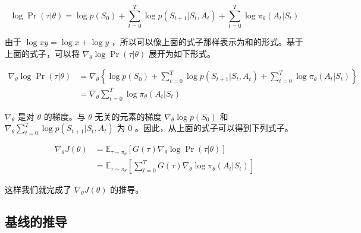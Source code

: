\documentclass[lang=cn,newtx,10pt,scheme=chinese]{elegantbook}
\begin{document}
\begin{equation}
\log\Pr(\tau|\theta)=\log{p(S_0)} + \sum_{t=0}^T\log{p(S_{t+1}|S_t,A_t)} + \sum_{t=0}^T\log\pi_\theta(A_t|S_t)
\end{equation}

由于 $\log xy = \log x + \log y$ ，所以可以像上面的式子那样表示为和的形式。基于上面的式子，可以将 $\nabla_\theta{\log\Pr(\tau|\theta)}$ 展开为如下形式。

\begin{equation}
\begin{aligned}
\nabla_\theta\log\Pr(\tau|\theta) &= \nabla_\theta\left\lbrace\log{p(S_0)} + \sum_{t=0}^T\log{p(S_{t+1}|S_t,A_t)} + \sum_{t=0}^T\log\pi_\theta(A_t|S_t)\right\rbrace \\
&= \nabla_\theta\sum_{t=0}^T\log\pi_\theta(A_t|S_t)
\end{aligned}
\end{equation}

$\nabla_\theta$ 是对 $\theta$ 的梯度。与 $\theta$ 无关的元素的梯度 $\nabla_\theta\log p(S_0)$ 和 $\nabla_\theta\sum_{t=0}^T\log{p(S_{t+1}|S_t,A_t)}$ 为 0 。因此，从上面的式子可以得到下列式子。

\begin{equation}
\begin{aligned}
\nabla_\theta{J(\theta)}&=\mathbb{E}_{\tau\sim\pi_\theta}\left\lbrack{G(\tau)\nabla_\theta\log\Pr(\tau|\theta)}\right\rbrack \\
&= \mathbb{E}_{\tau\sim\pi_\theta}\left\lbrack{\sum_{t=0}^TG(\tau)\nabla_\theta\log\pi_\theta(A_t|S_t)}\right\rbrack
\end{aligned}
\end{equation}

这样我们就完成了 $\nabla_\theta{J(\theta)}$ 的推导。


\subsection{基线的推导}
\end{document}
